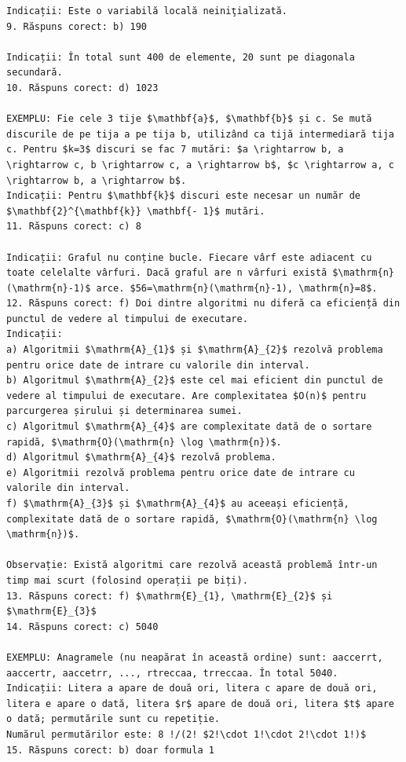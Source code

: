 \documentclass[10pt]{article}
\begin{document}
\begin{verbatim}
Indicații: Este o variabilă locală neiniţializată.
9. Răspuns corect: b) 190

Indicații: În total sunt 400 de elemente, 20 sunt pe diagonala secundară.
10. Răspuns corect: d) 1023

EXEMPLU: Fie cele 3 tije $\mathbf{a}$, $\mathbf{b}$ și c. Se mută discurile de pe tija a pe tija b, utilizând ca tijă intermediară tija c. Pentru $k=3$ discuri se fac 7 mutări: $a \rightarrow b, a \rightarrow c, b \rightarrow c, a \rightarrow b$, $c \rightarrow a, c \rightarrow b, a \rightarrow b$.
Indicații: Pentru $\mathbf{k}$ discuri este necesar un număr de $\mathbf{2}^{\mathbf{k}} \mathbf{- 1}$ mutări.
11. Răspuns corect: c) 8

Indicații: Graful nu conține bucle. Fiecare vârf este adiacent cu toate celelalte vârfuri. Dacă graful are n vârfuri există $\mathrm{n}(\mathrm{n}-1)$ arce. $56=\mathrm{n}(\mathrm{n}-1), \mathrm{n}=8$.
12. Răspuns corect: f) Doi dintre algoritmi nu diferă ca eficiență din punctul de vedere al timpului de executare.
Indicații:
a) Algoritmii $\mathrm{A}_{1}$ și $\mathrm{A}_{2}$ rezolvă problema pentru orice date de intrare cu valorile din interval.
b) Algoritmul $\mathrm{A}_{2}$ este cel mai eficient din punctul de vedere al timpului de executare. Are complexitatea $O(n)$ pentru parcurgerea șirului și determinarea sumei.
c) Algoritmul $\mathrm{A}_{4}$ are complexitate dată de o sortare rapidă, $\mathrm{O}(\mathrm{n} \log \mathrm{n})$.
d) Algoritmul $\mathrm{A}_{4}$ rezolvă problema.
e) Algoritmii rezolvă problema pentru orice date de intrare cu valorile din interval.
f) $\mathrm{A}_{3}$ și $\mathrm{A}_{4}$ au aceeași eficiență, complexitate dată de o sortare rapidă, $\mathrm{O}(\mathrm{n} \log \mathrm{n})$.

Observație: Există algoritmi care rezolvă această problemă într-un timp mai scurt (folosind operații pe biți).
13. Răspuns corect: f) $\mathrm{E}_{1}, \mathrm{E}_{2}$ și $\mathrm{E}_{3}$
14. Răspuns corect: c) 5040

EXEMPLU: Anagramele (nu neapărat în această ordine) sunt: aaccerrt, aaccertr, aaccetrr, ..., rtreccaa, trreccaa. În total 5040.
Indicații: Litera a apare de două ori, litera c apare de două ori, litera e apare o dată, litera $r$ apare de două ori, litera $t$ apare o dată; permutările sunt cu repetiție.
Numărul permutărilor este: 8 !/(2! $2!\cdot 1!\cdot 2!\cdot 1!)$
15. Răspuns corect: b) doar formula 1


\end{verbatim}
\end{document}
